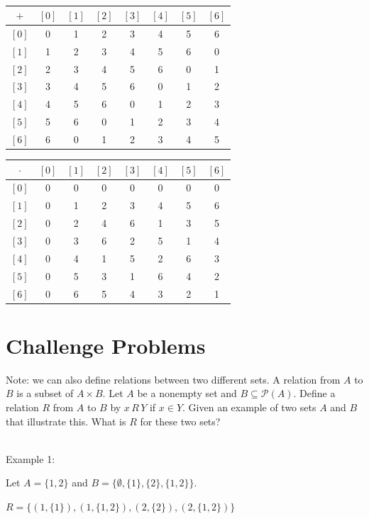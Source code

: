 \documentclass[12 pt]{exam}
\begin{document}
\begin{questions}
\begin{solution}\\

\begin{tabular} {c|ccccccc}
$+ $&$[0]$&$[1]$&$[2]$&$[3]$&$[4]$&$[5]$&$[6]$ \\
\hline

$[0]$&0&1&2&3&4&5&6\\
$[1]$&1&2&3&4&5&6&0\\
$[2]$&2&3&4&5&6&0&1\\
$[3]$&3&4&5&6&0&1&2\\
$[4]$&4&5&6&0&1&2&3\\
$[5]$&5&6&0&1&2&3&4\\
$[6]$&6&0&1&2&3&4&5\\
\end{tabular}

\begin{tabular} {c|ccccccc}
$\cdot $&$[0]$&$[1]$&$[2]$&$[3]$&$[4]$&$[5]$&$[6]$ \\
\hline

$[0]$&0&0&0&0&0&0&0\\
$[1]$&0&1&2&3&4&5&6\\
$[2]$&0&2&4&6&1&3&5\\
$[3]$&0&3&6&2&5&1&4\\
$[4]$&0&4&1&5&2&6&3\\
$[5]$&0&5&3&1&6&4&2\\
$[6]$&0&6&5&4&3&2&1\\
\end{tabular}

\end{solution}


\section*{Challenge Problems} 
\question Note: we can also define relations between two different sets. A relation from $A$ to $B$ is a subset of $A \times B.$ Let $A$ be a nonempty set and $B \subseteq \mathcal{P}(A)$. Define a relation $R$ from $A$ to $B$ by $x \, R \, Y$ if $x \in Y$. Given an example of two sets $A$ and $B$ that illustrate this. What is $R$ for these two sets?

\begin{solution}\\
Example 1:

Let $A = \{1, 2\}$ and $B = \{\emptyset, \{1\}, \{2\}, \{1, 2\}\}$.

$R = \{(1, \{1\}), (1, \{1, 2\}), (2, \{2\}), (2, \{1, 2\})\}$\\



\end{solution}
\end{questions}
\end{document}
